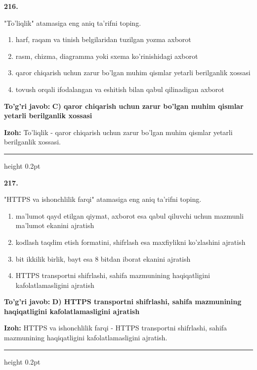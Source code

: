 \documentclass[10pt,a4paper,oneside]{article}
\begin{document}
\noindent\textbf{\color{ink}216.}
\par
"To'liqlik" atamasiga eng aniq ta'rifni toping.
\begin{enumerate}[label=\Alph*),leftmargin=9mm]
\item harf, raqam va tinish belgilaridan tuzilgan yozma axborot
\item rasm, chizma, diagramma yoki sxema ko'rinishidagi axborot
\item qaror chiqarish uchun zarur bo'lgan muhim qismlar yetarli berilganlik xossasi
\item tovush orqali ifodalangan va eshitish bilan qabul qilinadigan axborot
\end{enumerate}
\begin{tcolorbox}[enhanced,breakable,colback=teal!4,colframe=teal!50!black,boxrule=0.5pt,arc=1.1mm,left=3mm,right=3mm,top=1.7mm,bottom=1.7mm,before skip=2mm,after skip=2mm]
\textbf{\color{teal}To'g'ri javob:} \textbf{C) qaror chiqarish uchun zarur bo'lgan muhim qismlar yetarli berilganlik xossasi}
\par\smallskip
\textbf{Izoh:} To'liqlik - qaror chiqarish uchun zarur bo'lgan muhim qismlar yetarli berilganlik xossasi.
\end{tcolorbox}
\vspace{2mm}\hrule height 0.2pt \vspace{3mm}

\noindent\textbf{\color{ink}217.}
\par
"HTTPS va ishonchlilik farqi" atamasiga eng aniq ta'rifni toping.
\begin{enumerate}[label=\Alph*),leftmargin=9mm]
\item ma'lumot qayd etilgan qiymat, axborot esa qabul qiluvchi uchun mazmunli ma'lumot ekanini ajratish
\item kodlash taqdim etish formatini, shifrlash esa maxfiylikni ko'zlashini ajratish
\item bit ikkilik birlik, bayt esa 8 bitdan iborat ekanini ajratish
\item HTTPS transportni shifrlashi, sahifa mazmunining haqiqatligini kafolatlamasligini ajratish
\end{enumerate}
\begin{tcolorbox}[enhanced,breakable,colback=teal!4,colframe=teal!50!black,boxrule=0.5pt,arc=1.1mm,left=3mm,right=3mm,top=1.7mm,bottom=1.7mm,before skip=2mm,after skip=2mm]
\textbf{\color{teal}To'g'ri javob:} \textbf{D) HTTPS transportni shifrlashi, sahifa mazmunining haqiqatligini kafolatlamasligini ajratish}
\par\smallskip
\textbf{Izoh:} HTTPS va ishonchlilik farqi - HTTPS transportni shifrlashi, sahifa mazmunining haqiqatligini kafolatlamasligini ajratish.
\end{tcolorbox}
\vspace{2mm}\hrule height 0.2pt \vspace{3mm}
\end{document}
